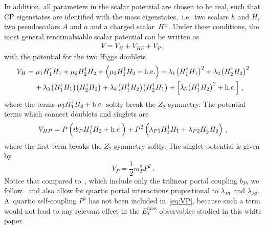 \documentclass[review]{elsarticle}
\newcommand{\MET}{\ensuremath{E_T^\mathrm{miss}}\xspace}
\begin{document}
In addition, all parameters in the scalar potential are chosen to be real, such that CP eigenstates are identified with the mass eigenstates,~i.e.~two scalars $h$ and $H$, two pseudoscalars $A$ and $a$ and a charged scalar~$H^\pm$. Under these conditions, the most general renormalisable scalar potential can be written as 
\begin{align} \label{eq:V2HDMa}
V=V_H+V_{HP}+V_P\,,
\end{align}
with the potential for the two Higgs doublets
\begin{equation}\label{eq:VH}
\begin{split}
V_{H} & = \mu_1 H_1^\dagger H_1 + \mu_2 H_2^\dagger H_2 + \left ( \mu_3  H_1^\dagger H_2 + {\rm h.c.} \right ) + \lambda_1  \hspace{0.25mm} \big ( H_1^\dagger H_1  \big )^2  + \lambda_2  \hspace{0.25mm} \big ( H_2^\dagger H_2 \big  )^2  \\
& \phantom{xx} +  \lambda_3 \hspace{0.25mm} \big ( H_1^\dagger H_1  \big ) \big ( H_2^\dagger H_2  \big ) + \lambda_4  \hspace{0.25mm} \big ( H_1^\dagger H_2  \big ) \big ( H_2^\dagger H_1  \big ) + \left [ \lambda_5   \hspace{0.25mm} \big ( H_1^\dagger H_2 \big )^2 + {\rm h.c.} \right ]  \,,
\end{split}
\end{equation}
where the terms $\mu_3  H_1^\dagger H_2 + {\rm h.c.}$  softly break the  $Z_2$ symmetry. The potential terms which connect doublets and singlets are 
\begin{equation} \label{eq:VHP}
\begin{split}
V_{HP}  = P \left ( i  b_P   H_1^\dagger H_2 + {\rm h.c.} \right ) + P^2 \left (  \lambda_{P1}  H_1^\dagger H_1 +   \lambda_{P2}    H_2^\dagger H_2 \right )  \,,
\end{split} 
\end{equation}
where the first term breaks the  $Z_2$ symmetry softly.  The singlet potential is given by 
\begin{equation} \label{eq:VP}
V_{P}  =  \frac{1}{2}  m_P^2  P^2  \,.
\end{equation}
Notice  that compared to~\cite{Ipek:2014gua,No:2015xqa,Goncalves:2016iyg,Tunney:2017yfp}, which include only the trilinear portal coupling $b_P$, we  follow~\cite{Bauer:2017ota} and also allow for quartic portal interactions proportional to $\lambda_{P1}$ and  $\lambda_{P2}$. A~quartic self-coupling $P^4$ has not been included in~\eqref{eq:VP}, because such a term would not lead to any relevant effect in the $\MET$ observables studied in this white paper.
\end{document}
